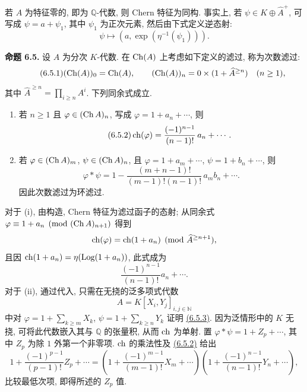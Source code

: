 若 \(A\) 为特征零的, 即为 \(\mathbb Q\)-代数, 则 Chern 特征为同构. 事实上, 若 \(\psi\in K\oplus\widehat A^+\), 可写成 \(\psi=a+\psi_1\), 其中 \(\psi_1\) 为正次元素, 然后由下式定义逆态射:
\[
  \psi\longmapsto (a,\exp(\eta^{-1}(\psi_1))).
\]

\textbf{命题 6.5.} 设 \(A\) 为分次 \(K\)-代数. 在 \(\operatorname{Ch}(A)\) 上考虑如下定义的滤过, 称为次数滤过:
\begin{equation}\tag{6.5.1}
  (\operatorname{Ch}(A))_0=\operatorname{Ch}(A),\qquad
  (\operatorname{Ch}(A))_n=0\times(1+\widehat A^{\ge n})\quad(n\ge1),
\end{equation}
其中 \(\widehat A^{\ge n}=\prod_{i\ge n}A^i\). 下列同余式成立.

\begin{enumerate}[label=\roman*)]
\item 若 \(n\ge1\) 且 \(\varphi\in(\operatorname{Ch} A)_n\), 写成 \(\varphi=1+a_n+\cdots\), 则
\begin{equation}\tag{6.5.2}
  \operatorname{ch}(\varphi)=\frac{(-1)^{n-1}}{(n-1)!}\,a_n+\cdots .
\end{equation}

\item 若 \(\varphi\in(\operatorname{Ch} A)_m\), \(\psi\in(\operatorname{Ch} A)_n\), 且
\(\varphi=1+a_m+\cdots\), \(\psi=1+b_n+\cdots\), 则
\begin{equation}\tag{6.5.3}
  \varphi*\psi
  =
  1-\frac{(m+n-1)!}{(m-1)!(n-1)!}\,a_m b_n+\cdots .
\end{equation}
因此次数滤过为环滤过.
\end{enumerate}

对于 (i), 由构造, Chern 特征为滤过函子的态射; 从同余式 \(\varphi\equiv1+a_n\pmod{(\operatorname{Ch} A)_{n+1}}\) 得到
\[
  \operatorname{ch}(\varphi)=\operatorname{ch}(1+a_n)\pmod{\widehat A^{\ge n+1}},
\]
且因 \(\operatorname{ch}(1+a_n)=\eta(\operatorname{Log}(1+a_n))\), 此式成为
\[
  \frac{(-1)^{n-1}}{(n-1)!}a_n+\cdots .
\]
对于 (ii), 通过代入, 只需在无挠的泛多项式代数
\[
 A=K[X_i,Y_j]_{i,j\in\mathbb N}
\]
中对 \(\varphi=1+\sum_{k\ge m}X_k\), \(\psi=1+\sum_{k\ge n}Y_k\) 证明 \hyperlink{sga6.e05.eq.6-5-3}{(6.5.3)}. 因为泛情形中的 \(K\) 无挠, 可将此代数嵌入其与 \(\mathbb Q\) 的张量积, 从而 \(\operatorname{ch}\) 为单射. 置 \(\varphi*\psi=1+Z_p+\cdots\), 其中 \(Z_p\) 为除 \(1\) 外第一个非零项. \(\operatorname{ch}\) 的乘法性及 \hyperlink{sga6.e05.eq.6-5-2}{(6.5.2)} 给出
\[
  1+\frac{(-1)^{p-1}}{(p-1)!}Z_p+\cdots
  =
  \left(1+\frac{(-1)^{m-1}}{(m-1)!}X_m+\cdots\right)
  \left(1+\frac{(-1)^{n-1}}{(n-1)!}Y_n+\cdots\right),
\]
比较最低次项, 即得所述的 \(Z_p\) 值.

